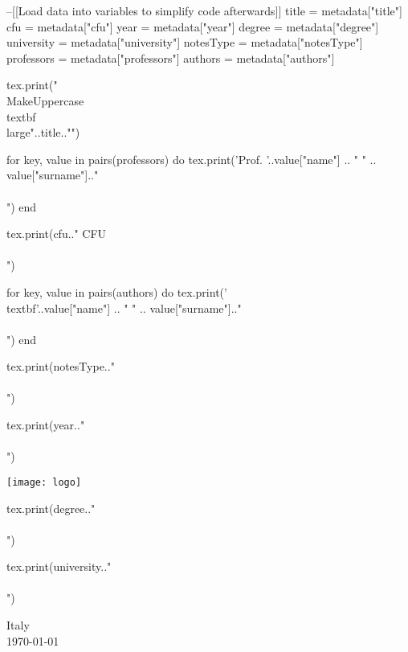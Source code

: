 \begin{luacode}
--[[Load data into variables to simplify code afterwards]]
title = metadata["title"]
cfu = metadata["cfu"]
year = metadata["year"]
degree = metadata["degree"]
university = metadata["university"]
notesType = metadata["notesType"]
professors = metadata["professors"]
authors = metadata["authors"]
\end{luacode}


\begin{titlepage}
\begin{center}
\vspace*{1em}
\begin{luacode}
		tex.print("\\MakeUppercase{\\textbf{\\large{"..title.."}}}")
\end{luacode}

\vspace{1em}

\begin{luacode}
		for key, value in pairs(professors) do
			 tex.print('Prof. '..value["name"] .. " " .. value["surname"].."\\\\")
		end
\end{luacode}
\begin{luacode}
		tex.print(cfu.." CFU\\\\")
\end{luacode}

\vspace{1em}

\begin{luacode}
		for key, value in pairs(authors) do
			 tex.print('\\textbf{'..value["name"] .. " " .. value["surname"].."}\\\\")
		end
\end{luacode}
                
\vfill
        
\begin{luacode}
		tex.print(notesType.."\\\\")
\end{luacode}
\begin{luacode}
		tex.print(year.."\\\\")
\end{luacode}

\texttt{[image: logo]}

\vspace{1em}

\begin{luacode}
		tex.print(degree.."\\\\")
\end{luacode}
\begin{luacode}
		tex.print(university.."\\\\")
\end{luacode}
Italy \\
\today

\end{center}
\end{titlepage}